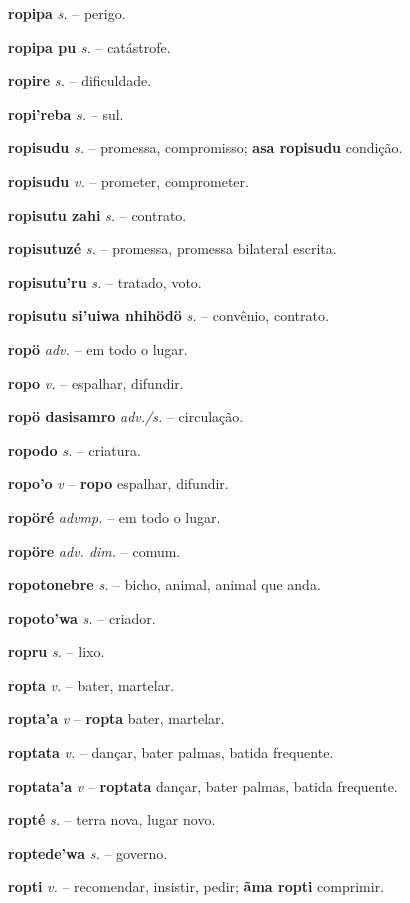 \textbf{ropipa} \textit{s.} -- perigo.

\textbf{ropipa pu} \textit{s.} -- catástrofe.

\textbf{ropire} \textit{s.} -- dificuldade.

\textbf{ropi'reba} \textit{s.} -- sul.

\textbf{ropisudu} \textit{s.} -- promessa, compromisso; \textbf{asa ropisudu} condição.

\textbf{ropisudu} \textit{v.} -- prometer, comprometer.

\textbf{ropisutu zahi} \textit{s.} -- contrato.

\textbf{ropisutuzé} \textit{s.} -- promessa, promessa bilateral escrita.

\textbf{ropisutu'ru} \textit{s.} -- tratado, voto.

\textbf{ropisutu si'uiwa nhihödö} \textit{s.} -- convênio, contrato.

\textbf{ropö} \textit{adv.} -- em todo o lugar.

\textbf{ropo} \textit{v.} -- espalhar, difundir.

\textbf{ropö dasisamro} \textit{adv./s.} -- circulação.

\textbf{ropodo} \textit{s.} -- criatura.

\textbf{ropo'o} \textit{v} -- \textbf{ropo} espalhar, difundir.

\textbf{ropöré} \textit{advmp.} -- em todo o lugar.

\textbf{ropöre} \textit{adv. dim.} -- comum.

\textbf{ropotonebre} \textit{s.} -- bicho, animal, animal que anda.

\textbf{ropoto'wa} \textit{s.} -- criador.

\textbf{ropru} \textit{s.} -- lixo.

\textbf{ropta} \textit{v.} -- bater, martelar.

\textbf{ropta'a} \textit{v} -- \textbf{ropta} bater, martelar.

\textbf{roptata} \textit{v.} -- dançar, bater palmas, batida frequente.

\textbf{roptata'a} \textit{v} -- \textbf{roptata} dançar, bater palmas, batida frequente.

\textbf{ropté} \textit{s.} -- terra nova, lugar novo.

\textbf{roptede'wa} \textit{s.} -- governo.

\textbf{ropti} \textit{v.} -- recomendar, insistir, pedir; \textbf{ãma ropti} comprimir.

